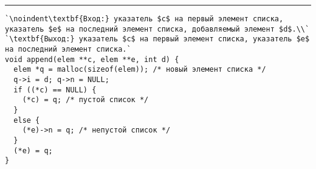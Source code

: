 \vspace{5pt} \hrule
\begin{lstlisting}[caption={Процедура Append — присоединение элемента в конец списка}, label=p44_append, escapechar=`]
`\noindent\textbf{Вход:} указатель $c$ на первый элемент списка, указатель $e$ на последний элемент списка, добавляемый элемент $d$.\\`
`\textbf{Выход:} указатель $c$ на первый элемент списка, указатель $e$ на последний элемент списка.`
void append(elem **c, elem **e, int d) {
  elem *q = malloc(sizeof(elem)); /* новый элемент списка */
  q->i = d; q->n = NULL;
  if ((*c) == NULL) {
    (*c) = q; /* пустой список */
  }
  else {
    (*e)->n = q; /* непустой список */
  }
  (*e) = q;
}
\end{lstlisting}
